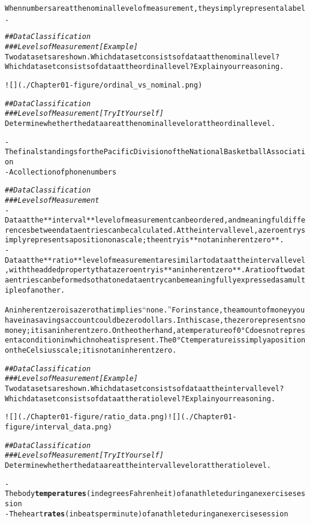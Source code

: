 \documentclass{article}\usepackage[]{graphicx}\usepackage[]{color}
\makeatletter
\newcommand{\hlcom}[1]{\textcolor[rgb]{0.678,0.584,0.686}{\textit{#1}}}%
\newcommand{\hlkwd}[1]{\textcolor[rgb]{0.737,0.353,0.396}{\textbf{#1}}}%
\newenvironment{kframe}{%
 \def\at@end@of@kframe{}%
 \ifinner\ifhmode%
  \def\at@end@of@kframe{\end{minipage}}%
  \begin{minipage}{\columnwidth}%
 \fi\fi%
 \def\FrameCommand##1{\hskip\@totalleftmargin \hskip-\fboxsep
 \colorbox{shadecolor}{##1}\hskip-\fboxsep
     \hskip-\linewidth \hskip-\@totalleftmargin \hskip\columnwidth}%
 \MakeFramed {\advance\hsize-\width
   \@totalleftmargin\z@ \linewidth\hsize
   \@setminipage}}%
 {\par\unskip\endMakeFramed%
 \at@end@of@kframe}
\newenvironment{knitrout}{}{} %
\makeatother
\begin{document}
\begin{knitrout}
\begin{kframe}
\begin{alltt}
When numbers are at the nominal level of measurement, they simply represent a label.

\hlcom{## Data Classification}
\hlcom{### Levels of Measurement [Example]}
Two data sets are shown. Which data set consists of data at the nominal level? Which data set consists of data at the ordinal level? Explain your reasoning.

![](./Chapter01-figure/ordinal_vs_nominal.png)

\hlcom{## Data Classification}
\hlcom{### Levels of Measurement [Try It Yourself]}
Determine whether the data are at the nominal level or at the ordinal level.

- The final standings for the Pacific Division of the National Basketball Association
- A collection of phone numbers

\hlcom{## Data Classification}
\hlcom{### Levels of Measurement}
- Data at the **interval** level of measurement can be ordered, and meaningful differences between data entries can be calculated. At the interval level, a zero entry simply represents a position on a scale; the entry is **not an inherent zero**.
- Data at the **ratio** level of measurement are similar to data at the interval level, with the added property that a zero entry is **an inherent zero**. A ratio of two data entries can be formed so that one data entry can be meaningfully expressed as a multiple of another.

An inherent zero is a zero that implies “none.” For instance, the amount of money you have in a savings account could be zero dollars. In this case, the zero represents no money; it is an inherent zero. On the other hand, a temperature of 0°C does not represent a condition in which no heat is present. The 0°C temperature is simply a position on the Celsius scale; it is not an inherent zero.

\hlcom{## Data Classification}
\hlcom{### Levels of Measurement [Example]}
Two data sets are shown. Which data set consists of data at the interval level? Which data set consists of data at the ratio level? Explain your reasoning.

![](./Chapter01-figure/ratio_data.png) ![](./Chapter01-figure/interval_data.png)

\hlcom{## Data Classification}
\hlcom{### Levels of Measurement [Try It Yourself]}
Determine whether the data are at the interval level or at the ratio level.

- The body \hlkwd{temperatures} (in degrees Fahrenheit) of an athlete during an exercise session
- The heart \hlkwd{rates} (in beats per minute) of an athlete during an exercise session


\end{alltt}
\end{kframe}
\end{knitrout}
\end{document}
